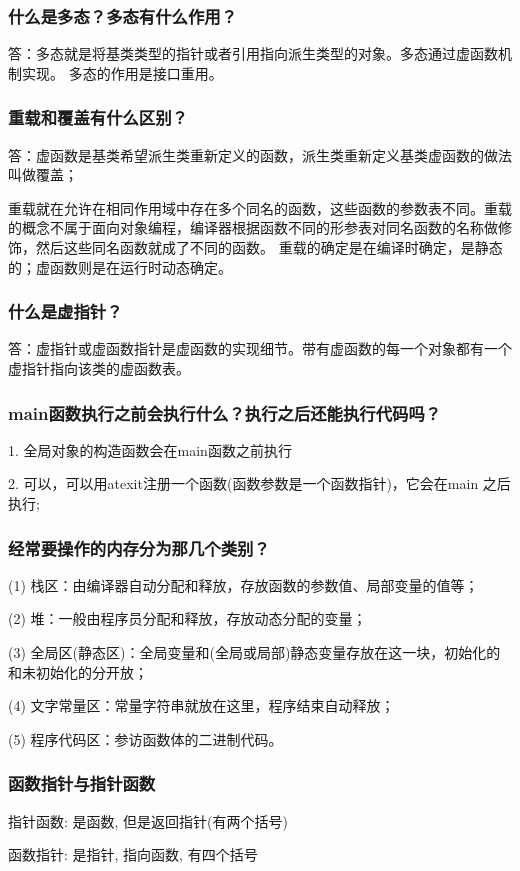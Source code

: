 \documentclass[UTF8]{ctexart}
\begin{document}
\subsubsection{什么是多态？多态有什么作用？}
答：多态就是将基类类型的指针或者引用指向派生类型的对象。多态通过虚函数机制实现。
多态的作用是接口重用。
\subsubsection{重载和覆盖有什么区别？}
答：虚函数是基类希望派生类重新定义的函数，派生类重新定义基类虚函数的做法叫做覆盖；\par
重载就在允许在相同作用域中存在多个同名的函数，这些函数的参数表不同。重载的概念不属于面向对象编程，编译器根据函数不同的形参表对同名函数的名称做修饰，然后这些同名函数就成了不同的函数。
重载的确定是在编译时确定，是静态的；虚函数则是在运行时动态确定。
\subsubsection{什么是虚指针？}
答：虚指针或虚函数指针是虚函数的实现细节。带有虚函数的每一个对象都有一个虚指针指向该类的虚函数表。
\subsubsection{main函数执行之前会执行什么？执行之后还能执行代码吗？}
1. 全局对象的构造函数会在main函数之前执行 \par
2. 可以，可以用atexit注册一个函数(函数参数是一个函数指针)，它会在main 之后执行; \par
\subsubsection{经常要操作的内存分为那几个类别？} 
(1) 栈区：由编译器自动分配和释放，存放函数的参数值、局部变量的值等；

(2) 堆：一般由程序员分配和释放，存放动态分配的变量；

(3) 全局区(静态区)：全局变量和(全局或局部)静态变量存放在这一块，初始化的和未初始化的分开放；

(4) 文字常量区：常量字符串就放在这里，程序结束自动释放；

(5) 程序代码区：参访函数体的二进制代码。
\subsubsection{函数指针与指针函数}
指针函数: 是函数, 但是返回指针(有两个括号) \par
函数指针: 是指针, 指向函数, 有四个括号 \par
\end{document}

